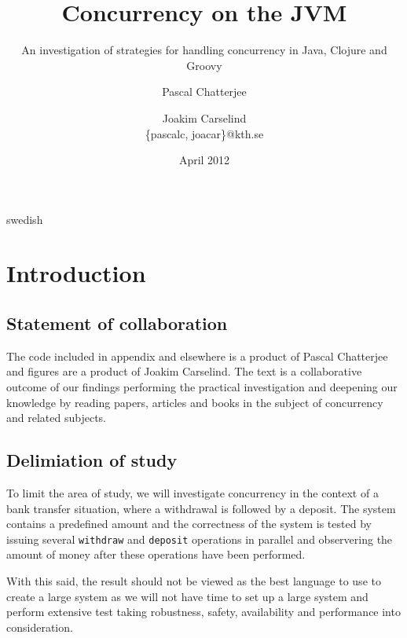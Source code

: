 \documentclass[a4paper,12pt]{kth-mag}
\title{Concurrency on the JVM}
\subtitle{An investigation of strategies for handling concurrency in Java, Clojure and Groovy}
\author{Pascal Chatterjee \and Joakim Carselind \\ \small{\{pascalc, joacar\}@kth.se}}
\date{April 2012}
\begin{document}
\frontmatter
\pagestyle{empty}
\removepagenumbers
\maketitle
{}

\begin{abstract}
    
\end{abstract}

\clearpage

\begin{foreignabstract}{swedish}
  
\end{foreignabstract}

\clearpage

\tableofcontents*
\mainmatter
\pagestyle{newchap}
\makeatletter\@openrightfalse

\chapter{Introduction}

\section{Statement of collaboration}
The code included in appendix and elsewhere is a product of Pascal Chatterjee and figures are a product of Joakim Carselind. The text is a collaborative outcome of our findings performing the practical investigation and deepening our knowledge by reading papers, articles and books in the subject of concurrency and related subjects.

\section{Delimiation of study}
To limit the area of study, we will investigate concurrency in the context of a bank transfer situation, where a withdrawal is followed by a deposit. The system contains a predefined amount and the correctness of the system is tested by issuing several \texttt{withdraw} and \texttt{deposit} operations in parallel and observering the amount of money after these operations have been performed.

With this said, the result should not be viewed as the best language to use to create a large system as we will not have time to set up a large system and perform extensive test taking robustness, safety, availability and performance into consideration.
\end{document}
